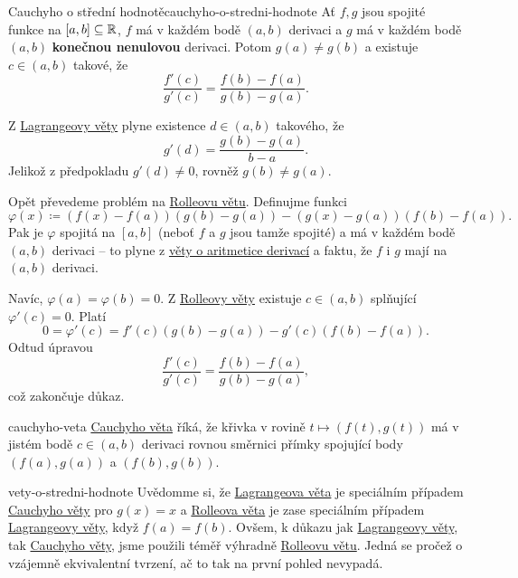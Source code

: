 \begin{theorem}{Cauchyho o střední hodnotě}{cauchyho-o-stredni-hodnote}
 Ať $f,g$ jsou spojité funkce na $[a,b] \subseteq \mathbb{R}$, $f$ má v každém bodě
 $(a,b)$ derivaci a $g$ má v každém bodě $(a,b)$ \textbf{konečnou nenulovou}
 derivaci. Potom $g(a) \neq g(b)$ a existuje $c \in (a,b)$ takové, že
 \[
  \frac{f'(c)}{g'(c)} = \frac{f(b) - f(a)}{g(b) - g(a)}.
 \]
\end{theorem}
\begin{thmproof}
 Z \hyperref[thm:lagrangeova-o-stredni-hodnote]{Lagrangeovy věty} plyne
 existence $d \in (a,b)$ takového, že
 \[
  g'(d) = \frac{g(b) - g(a)}{b - a}.
 \]
 Jelikož z předpokladu $g'(d) \neq 0$, rovněž $g(b) \neq g(a)$.

 Opět převedeme problém na
 \hyperref[thm:rolleova-veta-o-stredni-hodnote]{Rolleovu větu}. Definujme funkci
 \[
  \varphi(x) \coloneqq (f(x) - f(a))(g(b) - g(a)) - (g(x) - g(a))(f(b) - f(a)).
 \]
 Pak je $\varphi$ spojitá na $[a,b]$ (neboť $f$ a $g$ jsou tamže spojité) a má v
 každém bodě $(a,b)$ derivaci -- to plyne z
 \hyperref[thm:aritmetika-derivaci]{věty o aritmetice derivací} a faktu, že $f$
 i $g$ mají na $(a,b)$ derivaci.

 Navíc, $\varphi(a) = \varphi(b) = 0$. Z
 \hyperref[thm:rolleova-veta-o-stredni-hodnote]{Rolleovy věty} existuje $c \in
 (a,b)$ splňující $\varphi'(c) = 0$. Platí
 \[
  0 = \varphi'(c) = f'(c)(g(b) - g(a)) - g'(c)(f(b) - f(a)).
 \]
 Odtud úpravou
 \[
  \frac{f'(c)}{g'(c)} = \frac{f(b) - f(a)}{g(b) - g(a)},
 \]
 což zakončuje důkaz.
\end{thmproof}
\begin{remark}{}{cauchyho-veta}
 \hyperref[thm:cauchyho-o-stredni-hodnote]{Cauchyho věta} říká, že křivka v
 rovině $t \mapsto (f(t),g(t))$ má v jistém bodě $c \in (a,b)$ derivaci rovnou
 směrnici přímky spojující body $(f(a),g(a))$ a $(f(b),g(b))$.
\end{remark}
\begin{remark}{}{vety-o-stredni-hodnote}
 Uvědomme si, že \hyperref[thm:lagrangeova-o-stredni-hodnote]{Lagrangeova věta}
 je speciálním případem \hyperref[thm:cauchyho-o-stredni-hodnote]{Cauchyho věty}
 pro $g(x) = x$ a \hyperref[thm:rolleova-veta-o-stredni-hodnote]{Rolleova věta}
 je zase speciálním případem
 \hyperref[thm:lagrangeova-o-stredni-hodnote]{Lagrangeovy věty}, když $f(a) =
 f(b)$. Ovšem, k důkazu jak
 \hyperref[thm:lagrangeova-o-stredni-hodnote]{Lagrangeovy věty}, tak
 \hyperref[thm:cauchyho-o-stredni-hodnote]{Cauchyho věty}, jsme použili téměř
 výhradně \hyperref[thm:rolleova-veta-o-stredni-hodnote]{Rolleovu větu}. Jedná
 se pročež o vzájemně ekvivalentní tvrzení, ač to tak na první pohled nevypadá.
\end{remark}
